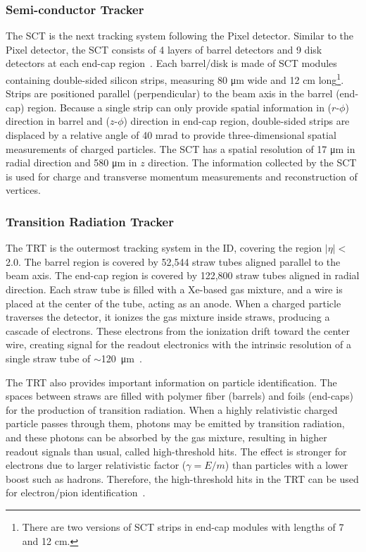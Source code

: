 \subsubsection{Semi-conductor Tracker}
\label{sec:atlas:sct}

The SCT is the next tracking system following the Pixel detector. Similar to the Pixel detector, the SCT consists of 4 layers of barrel detectors and 9 disk detectors at each end-cap region~\cite{Abdesselam:974073,Abdesselam:973395}. Each barrel/disk is made of SCT modules containing double-sided silicon strips, measuring 80 \si{\micro\meter} wide and 12 \si{\centi\meter} long\footnote{There are two versions of SCT strips in end-cap modules with lengths of 7 and 12 \si{cm}.}. Strips are positioned parallel (perpendicular) to the beam axis in the barrel (end-cap) region. Because a single strip can only provide spatial information in ($r$-$\phi$) direction in barrel and ($z$-$\phi$) direction in end-cap region, double-sided strips are displaced by a relative angle of 40 \si{\milli\radian} to provide three-dimensional spatial measurements of charged particles. The SCT has a spatial resolution of 17 \si{\micro\meter} in radial direction and 580 \si{\micro\meter} in $z$ direction. The information collected by the SCT is used for charge and transverse momentum measurements and reconstruction of vertices.


\subsubsection{Transition Radiation Tracker}
\label{sec:atlas:trt}

The TRT is the outermost tracking system in the ID, covering the region $|\eta| < $ 2.0. The barrel region is covered by 52,544 straw tubes aligned parallel to the beam axis. The end-cap region is covered by 122,800 straw tubes aligned in radial direction. Each straw tube is filled with a Xe-based gas mixture, and a wire is placed at the center of the tube, acting as an anode. When a charged particle traverses the detector, it ionizes the gas mixture inside straws, producing a cascade of electrons. These electrons from the ionization drift toward the center wire, creating signal for the readout electronics with the intrinsic resolution of a single straw tube of $\sim$120~\si{\micro\meter}~\cite{Vogel:1537991}. 

The TRT also provides important information on particle identification. The spaces between straws are filled with polymer fiber (barrels) and foils (end-caps) for the production of transition radiation. When a highly relativistic charged particle passes through them, photons may be emitted by transition radiation, and these photons can be absorbed by the gas mixture, resulting in higher readout signals than usual, called high-threshold hits. The effect is stronger for electrons due to larger relativistic factor ($\gamma = E/m$) than particles with a lower boost such as hadrons. Therefore, the high-threshold hits in the TRT can be used for electron/pion identification~\cite{ATLAS-CONF-2011-128}.

